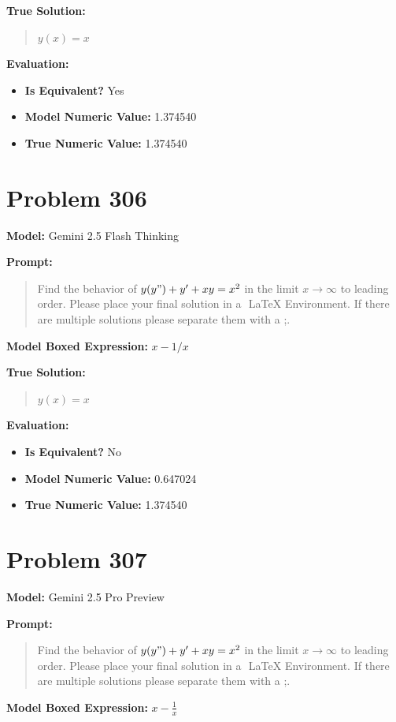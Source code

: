 \documentclass{article}
\begin{document}
{\textbf{True Solution:}
\begin{quote}
$y(x) = x$
\end{quote}

\textbf{Evaluation:}
\begin{itemize}
\item \textbf{Is Equivalent?} Yes
\item \textbf{Model Numeric Value:} 1.374540
\item \textbf{True Numeric Value:} 1.374540
\end{itemize}
\vspace{1cm}
\section*{Problem 306}
\textbf{Model:} Gemini 2.5 Flash Thinking

\textbf{Prompt:}
\begin{quote}
Find the behavior of $y(y") + y' + xy = x^2$ in the limit $ x \rightarrow \infty$ to leading order. Please place your final solution in a $\boxed{}$ LaTeX Environment. If there are multiple solutions please separate them with a ;.
\end{quote}
\textbf{Model Boxed Expression:} $x-1/x$

\textbf{True Solution:}
\begin{quote}
$y(x) = x$
\end{quote}

\textbf{Evaluation:}
\begin{itemize}
\item \textbf{Is Equivalent?} No
\item \textbf{Model Numeric Value:} 0.647024
\item \textbf{True Numeric Value:} 1.374540
\end{itemize}
\vspace{1cm}
\section*{Problem 307}
\textbf{Model:} Gemini 2.5 Pro Preview

\textbf{Prompt:}
\begin{quote}
Find the behavior of $y(y") + y' + xy = x^2$ in the limit $ x \rightarrow \infty$ to leading order. Please place your final solution in a $\boxed{}$ LaTeX Environment. If there are multiple solutions please separate them with a ;.
\end{quote}
\textbf{Model Boxed Expression:} $x - \frac{1}{x}$

}
\end{document}
